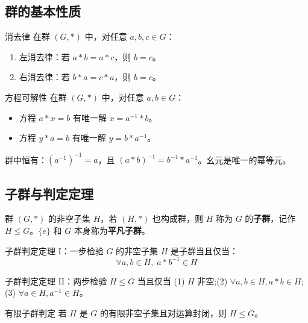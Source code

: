 \subsection{群的基本性质}

\begin{myTheorem}{消去律}
在群 $(G,*)$ 中，对任意 $a,b,c \in G$：
\begin{enumerate}
    \item 左消去律：若 $a*b = a*c$，则 $b = c$。
    \item 右消去律：若 $b*a = c*a$，则 $b = c$。
\end{enumerate}
\end{myTheorem}

\begin{myTheorem}{方程可解性}
在群 $(G,*)$ 中，对任意 $a,b \in G$：
\begin{itemize}
    \item 方程 $a*x = b$ 有唯一解 $x = a^{-1}*b$。
    \item 方程 $y*a = b$ 有唯一解 $y = b*a^{-1}$。
\end{itemize}
\end{myTheorem}

\begin{myTheorem}{}
群中恒有：$(a^{-1})^{-1} = a$，且 $(a*b)^{-1} = b^{-1}*a^{-1}$。幺元是唯一的幂等元。
\end{myTheorem}

\subsection{子群与判定定理}

\begin{mydefinition}{}
群 $(G,*)$ 的非空子集 $H$，若 $(H,*)$ 也构成群，则 $H$ 称为 $G$ 的\textbf{子群}，记作 $H \leq G$。$\{e\}$ 和 $G$ 本身称为\textbf{平凡子群}。
\end{mydefinition}

\begin{myTheorem}{子群判定定理 I：一步检验}
$G$ 的非空子集 $H$ 是子群当且仅当：
\[
\forall a,b \in H,\; a*b^{-1} \in H
\]
\end{myTheorem}

\begin{myTheorem}{子群判定定理 II：两步检验}
$H \leq G$ 当且仅当 (1) $H$ 非空;(2) $\forall a,b\in H, a*b\in H$;(3) $\forall a\in H, a^{-1}\in H$。
\end{myTheorem}

\begin{myTheorem}{有限子群判定}
若 $H$ 是 $G$ 的有限非空子集且对运算封闭，则 $H \leq G$。
\end{myTheorem}

